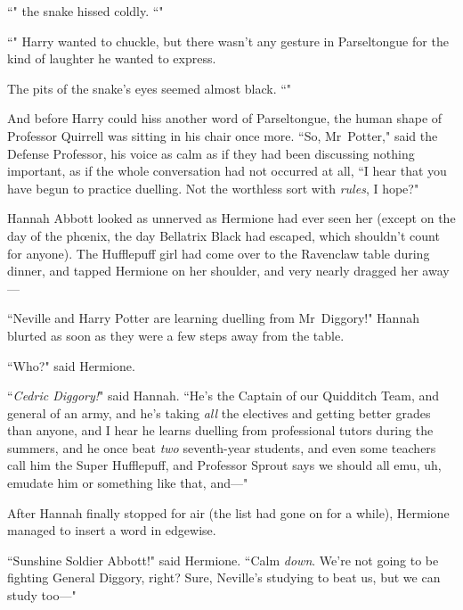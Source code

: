 ``" the snake hissed coldly. ``"

``" Harry wanted to chuckle, but there wasn't any gesture in Parseltongue for the kind of laughter he wanted to express.

The pits of the snake's eyes seemed almost black. ``"

And before Harry could hiss another word of Parseltongue, the human shape of Professor Quirrell was sitting in his chair once more. ``So, Mr~Potter," said the Defense Professor, his voice as calm as if they had been discussing nothing important, as if the whole conversation had not occurred at all, ``I hear that you have begun to practice duelling. Not the worthless sort with \emph{rules}, I hope?"

\later

Hannah Abbott looked as unnerved as Hermione had ever seen her (except on the day of the phœnix, the day Bellatrix Black had escaped, which shouldn't count for anyone). The Hufflepuff girl had come over to the Ravenclaw table during dinner, and tapped Hermione on her shoulder, and very nearly dragged her away—

``Neville and Harry Potter are learning duelling from Mr~Diggory!" Hannah blurted as soon as they were a few steps away from the table.

``Who?" said Hermione.

``\emph{Cedric Diggory!}" said Hannah. ``He's the Captain of our Quidditch Team, and general of an army, and he's taking \emph{all} the electives and getting better grades than anyone, and I hear he learns duelling from professional tutors during the summers, and he once beat \emph{two} seventh-year students, and even some teachers call him the Super Hufflepuff, and Professor Sprout says we should all emu, uh, emudate him or something like that, and—"

After Hannah finally stopped for air (the list had gone on for a while), Hermione managed to insert a word in edgewise.

``Sunshine Soldier Abbott!" said Hermione. ``Calm \emph{down}. We're not going to be fighting General Diggory, right? Sure, Neville's studying to beat us, but we can study too—"

